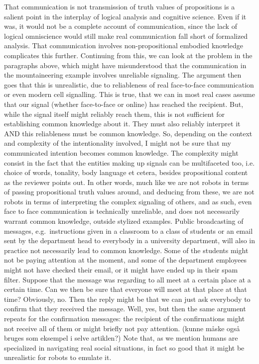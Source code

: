 \documentclass[a4paper]{article}
\newenvironment{tsn}{\smallskip \noindent \color{purple}}{\color{black}\smallskip}
\newenvironment{tobo}{\smallskip \noindent \color{yellow!80!black!80}}{\color{black}\smallskip}
\begin{document}
\begin{tsn}
That communication is not transmission of truth values of propositions is a salient point in the interplay of logical analysis and cognitive science. Even if it was, it would not be a complete account of communication, since the lack of logical omniscience would still make real communication fall short of formalized analysis. That communication involves non-propositional embodied knowledge complicates this further. Continuing from this, we can look at the problem in the paragraphs above, which might have misunderstood that the communication in the mountaineering example involves unreliable signaling. The argument then goes that this is unrealistic, due to reliableness of real face-to-face communication or even modern cell signalling. This is true, that we can in most real cases assume that our signal (whether face-to-face or online) has reached the recipient. But, while the signal itself might reliably reach them, this is not sufficient for establishing common knowledge about it. They must also reliably interpret it AND this reliableness must be common knowledge.  So, depending on the context and complexity of the intentionality involved, I might not be sure that my communicated intention becomes common knowledge. The complexity might consist in the fact that the entities making up signals can be multifaceted too, i.e. choice of words, tonality, body language et cetera, besides propositional content as the reviewer points out. In other words, much like we are not robots in terms of passing propositional truth values around, and deducing from these, we are not robots in terms of interpreting the complex signaling of others, and as such, even face to face communication is technically unreliable, and does not necessarily warrant common knowledge, outside stylized examples. 
\begin{tobo}
Public broadcasting of messages, e.g.\ instructions given in a classroom to a class of students or an email sent by the department head to everybody in a university department, will also in practice not necessarily lead to common knowledge. Some of the students might not be paying attention at the moment, and some of the department employees might not have checked their email, or it might have ended up in their spam filter. Suppose that the message was regarding to all meet at a certain place at a certain time. Can we then be sure that everyone will meet at that place at that time? Obviously, no. Then the reply might be that we can just ask everybody to confirm that they received the message. Well, yes, but then the same argument repeats for the confirmation messages: the recipient of the confirmations might not receive all of them or might briefly not pay attention. (kunne måske også bruges som eksempel i selve artiklen?)
\end{tobo}
Note that, as we mention humans are specialized in navigating real social situations, in fact so good that it might be unrealistic for robots to emulate it.
\end{tsn}
\end{document}
